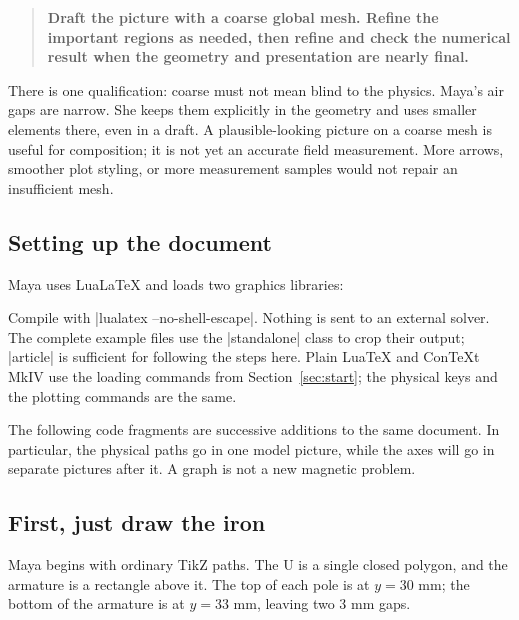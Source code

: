 \begin{quote}
\textbf{Draft the picture with a coarse global mesh. Refine the important
regions as needed, then refine and check the numerical result when the
geometry and presentation are nearly final.}
\end{quote}

There is one qualification: coarse must not mean blind to the physics.
Maya's air gaps are narrow. She keeps them explicitly in the geometry and
uses smaller elements there, even in a draft. A plausible-looking picture
on a coarse mesh is useful for composition; it is not yet an accurate
field measurement. More arrows, smoother plot styling, or more measurement
samples would not repair an insufficient mesh.

\subsection{Setting up the document}

Maya uses LuaLaTeX and loads two graphics libraries:
Compile with |lualatex --no-shell-escape|. Nothing is sent to an external
solver. The complete example files use the |standalone| class to crop their
output; |article| is sufficient for following the steps here. Plain LuaTeX
and ConTeXt MkIV use the loading commands from Section~\ref{sec:start};
the physical keys and the plotting commands are the same.

The following code fragments are successive additions to the same document.
In particular, the physical paths go in one model picture, while the axes
will go in separate pictures after it. A graph is not a new magnetic problem.

\subsection{First, just draw the iron}

Maya begins with ordinary TikZ paths. The U is a single closed polygon, and
the armature is a rectangle above it. The top of each pole is at $y=30$ mm;
the bottom of the armature is at $y=33$ mm, leaving two 3 mm gaps.
\begin{codeexample}[width=5cm]
\end{codeexample}


